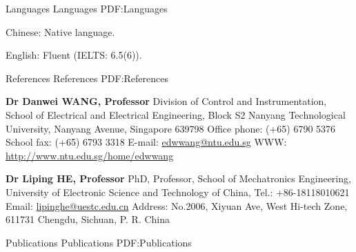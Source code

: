 \documentclass[letterpaper,MMMyyyy,nonstopmode]{simpleresumecv}
\begin{document}
\begin{Body}

\Section
{Languages}
{Languages}
{PDF:Languages}

\BulletItem
Chinese: Native language.

\Gap
\BulletItem
English: Fluent (IELTS: 6.5(6)).



\Section
{References}
{References}
{PDF:References}

\BulletItem
\textbf{Dr Danwei WANG, Professor}
\newline
Division of Control and Instrumentation,
School of Electrical and Electrical Engineering, Block S2
\newline
Nanyang Technological University,
Nanyang Avenue, Singapore 639798
\newline
Office phone: (+65) 6790 5376
\newline
School fax: (+65) 6793 3318
\newline
E-mail: \url{edwwang@ntu.edu.sg}
\newline
WWW: \url{http://www.ntu.edu.sg/home/edwwang}

\Gap
\BulletItem
\textbf{Dr Liping HE, Professor}
\newline
PhD, Professor, School of Mechatronics Engineering,
\newline
University of Electronic Science and Technology of China,
\newline
Tel.: +86-18118010621
\newline
Email: \url{lipinghe@uestc.edu.cn}
\newline
Address: No.2006, Xiyuan Ave, West Hi-tech Zone, 611731 Chengdu, Sichuan, P. R. China


\Section
{Publications}
{Publications}
{PDF:Publications}

\begingroup
\renewcommand{\MaxNumberedItem}{[88]}

\nocite{*}



\endgroup













\end{Body}


\UseNoteFont%
\null\hfill%
\end{document}
